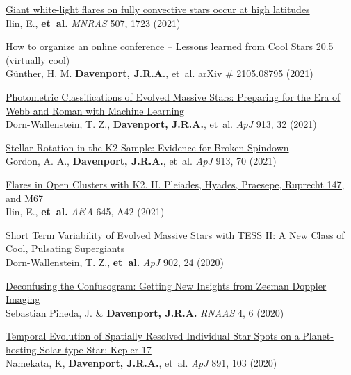 \begin{etaremune}[leftmargin=10pt]
\item{\sc \href{https://arxiv.org/abs/2108.01917}{\color{NavyBlue} Giant white-light flares on fully convective stars occur at high latitudes}}\\
Ilin, E., {\bf et~al.} {\em MNRAS} 507, 1723 (2021)

\item{\sc \href{https://arxiv.org/abs/2105.08795}{\color{NavyBlue} How to organize an online conference -- Lessons learned from Cool Stars 20.5 (virtually cool)}}\\
G\"{u}nther, H. M. {\bf Davenport,  J.R.A.}, et~al. arXiv \# 2105.08795 (2021)

\item{\sc \href{https://arxiv.org/abs/2102.02829}{\color{NavyBlue} Photometric Classifications of Evolved Massive Stars: Preparing for the Era of Webb and Roman with Machine Learning}}\\
Dorn-Wallenstein, T. Z., {\bf Davenport,  J.R.A.}, et~al.  {\em ApJ} 913, 32 (2021)

\item{\sc \href{https://arxiv.org/abs/2101.07886}{\color{NavyBlue} Stellar Rotation in the K2 Sample: Evidence for Broken Spindown}}\\
Gordon, A. A., {\bf Davenport,  J.R.A.}, et~al.  {\em ApJ} 913, 70 (2021)

\item{\sc \href{https://arxiv.org/abs/2010.05576}{\color{NavyBlue} Flares in Open Clusters with K2. II. Pleiades, Hyades, Praesepe, Ruprecht 147, and M67}}\\
Ilin, E., {\bf et~al.} {\em A\&A} 645, A42 (2021)


\item{\sc \href{https://arxiv.org/abs/2008.11723}{\color{NavyBlue} Short Term Variability of Evolved Massive Stars with TESS II: A New Class of Cool, Pulsating Supergiants }}\\
Dorn-Wallenstein, T. Z., {\bf et~al.} {\em ApJ} 902, 24 (2020)

\item{\sc \href{https://iopscience.iop.org/article/10.3847/2515-5172/ab98f4}{\color{NavyBlue} Deconfusing the Confusogram: Getting New Insights from Zeeman Doppler Imaging}}\\
Sebastian Pineda, J. \& {\bf Davenport,  J.R.A.} {\em RNAAS} 4, 6 (2020)

\item{\sc \href{https://ui.adsabs.harvard.edu/abs/2020ApJ...891..103N}{\color{NavyBlue} Temporal Evolution of Spatially Resolved Individual Star Spots on a Planet-hosting Solar-type Star: Kepler-17}}\\
Namekata, K, {\bf Davenport,  J.R.A.}, et~al. {\em ApJ} 891, 103 (2020)


\end{etaremune}
